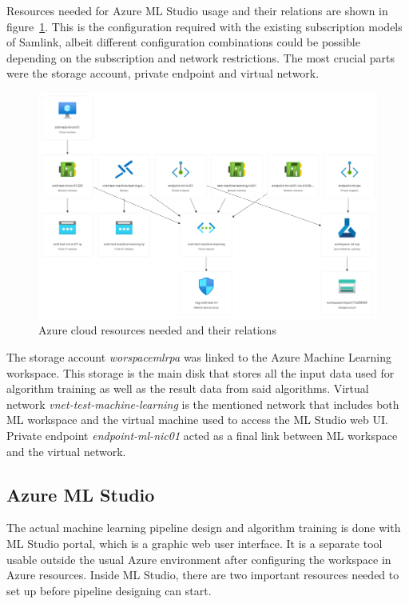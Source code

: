 Resources needed for Azure ML Studio usage and their relations
are shown in figure~\ref{fig:azure-diagram}.
This is the configuration required
with the existing subscription models of Samlink,
albeit different configuration combinations could be possible
depending on the subscription and network restrictions.
The most crucial parts were
the storage account, private endpoint and virtual network.

\begin{figure}[htb]
    \centering
    \includegraphics[width=\textwidth]{./appendices/azure-resource-diagram}
    \caption{Azure cloud resources needed and their relations
    \label{fig:azure-diagram}}
\end{figure}

The storage account \textit{worspacemlrpa}
was linked to the Azure Machine Learning workspace.
This storage is the main disk
that stores all the input data used for algorithm training
as well as the result data from said algorithms.
Virtual network \textit{vnet-test-machine-learning}
is the mentioned network
that includes both ML workspace and the virtual machine
used to access the ML Studio web UI\@.
Private endpoint \textit{endpoint-ml-nic01}
acted as a final link between ML workspace and the virtual network.



\subsection{Azure ML Studio}\label{subsec:meth-azure-ml-studio}

The actual machine learning pipeline design and algorithm training
is done with ML Studio portal,
which is a graphic web user interface.
It is a separate tool usable outside the usual Azure environment
after configuring the workspace in Azure resources.
Inside ML Studio,
there are two important resources needed to set up
before pipeline designing can start.

